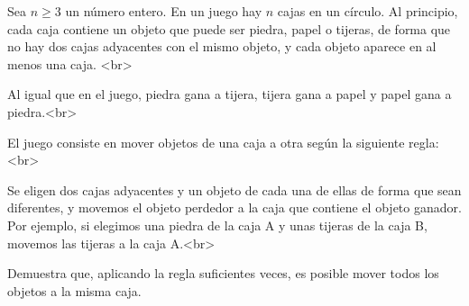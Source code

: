 Sea $n\ge 3$ un número entero. En un juego hay $n$ cajas en un círculo. Al principio, cada caja contiene un objeto que puede ser piedra, papel o tijeras, de forma que no hay dos cajas adyacentes con el mismo objeto, y cada objeto aparece en al menos una caja. <br>

Al igual que en el juego, piedra gana a tijera, tijera gana a papel y papel gana a piedra.<br> 

El juego consiste en mover objetos de una caja a otra según la siguiente regla: <br>

Se eligen dos cajas adyacentes y un objeto de cada una de ellas de forma que sean diferentes, y movemos el objeto perdedor a la caja que contiene el objeto ganador. Por ejemplo, si elegimos una piedra de la caja A y unas tijeras de la caja B, movemos las tijeras a la caja A.<br>

Demuestra que, aplicando la regla suficientes veces, es posible mover todos los objetos a la misma caja.
